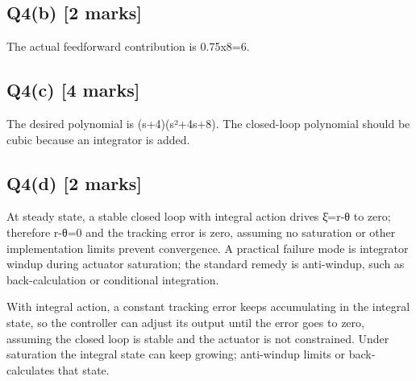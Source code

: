 \documentclass[11pt,a4paper]{article}
\begin{document}
\subsection*{Q4(b) \hfill [2 marks]}

The actual feedforward contribution is 0.75x8=6.

\subsection*{Q4(c) \hfill [4 marks]}

The desired polynomial is (s+4)(s²+4s+8).
The closed-loop polynomial should be cubic because an integrator is added.

\subsection*{Q4(d) \hfill [2 marks]}

At steady state, a stable closed loop with integral action drives ξ̇=r-θ to zero; therefore r-θ=0 and the tracking error is zero, assuming no saturation or other implementation limits prevent convergence.
A practical failure mode is integrator windup during actuator saturation; the standard remedy is anti-windup, such as back-calculation or conditional integration.\par\smallskip With integral action, a constant tracking error keeps accumulating in the integral state, so the controller can adjust its output until the error goes to zero, assuming the closed loop is stable and the actuator is not constrained. Under saturation the integral state can keep growing; anti-windup limits or back-calculates that state.
\end{document}

